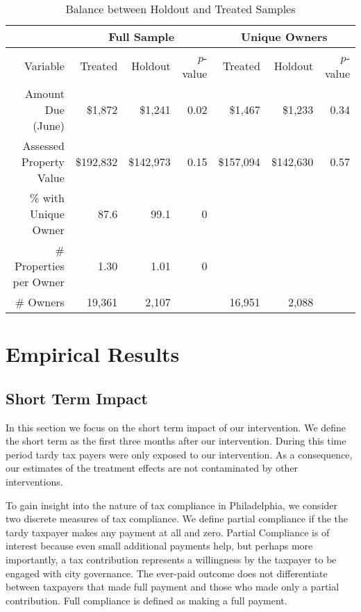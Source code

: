 \documentclass[12pt]{article}
\begin{document}
\begin{table}[ht]
\centering
\caption{Balance between Holdout and Treated Samples} 
\label{tbl:bal_hold}
\begin{tabular}{|r|rrr|rrr|}
   \hline
 & \multicolumn{3}{c|}{Full Sample} & \multicolumn{3}{c|}{Unique Owners} \\
\hline
Variable & Treated & Holdout & $p$-value & Treated & Holdout & $p$-value \\ 
  Amount Due (June) & \$1,872 & \$1,241 & 0.02 & \$1,467 & \$1,233 & 0.34 \\ 
  Assessed Property Value & \$192,832 & \$142,973 & 0.15 & \$157,094 & \$142,630 & 0.57 \\ 
  \% with Unique Owner & 87.6 & 99.1 & 0 &  &  &  \\ 
  \# Properties per Owner & 1.30 & 1.01 & 0 &  &  &  \\ 
  \# Owners & 19,361 & 2,107 &  & 16,951 & 2,088 &  \\ 
   \hline
\end{tabular}
\end{table}

\newpage

\section{Empirical Results}

\subsection{Short Term Impact}

In this section we focus on the short term impact of our intervention. We define the
short term as the first three months after our intervention. During this time period
tardy tax payers were only exposed to our intervention. As a consequence, our estimates
of the treatment effects are not contaminated by other interventions.

To gain insight into the nature of tax compliance in Philadelphia, 
we consider two discrete measures of tax compliance. We define partial compliance if the
 the tardy taxpayer makes any payment at all  and zero.  
Partial Compliance is of interest because even small 
additional payments help, but perhaps more importantly, a tax 
contribution represents a willingness by the taxpayer to be engaged 
with city governance.  The ever-paid outcome does not differentiate between
taxpayers that made full payment and those who made only a partial
contribution.  Full compliance is defined as making a full payment. 
\end{document}
